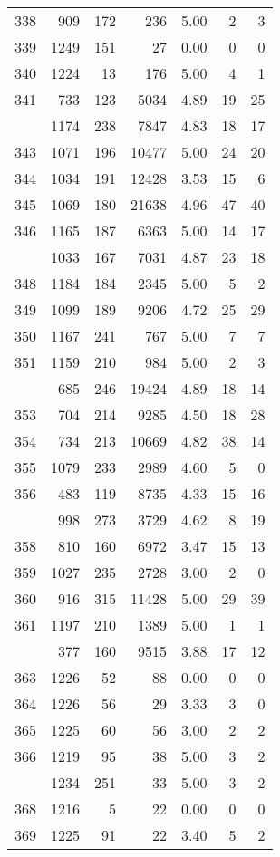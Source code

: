 \documentclass[
]{article}
\begin{document}
\begin{table}
\begin{tabular}[t]{lrrrrrr}
338 & 909 & 172 & 236 & 5.00 & 2 & 3\\
339 & 1249 & 151 & 27 & 0.00 & 0 & 0\\
340 & 1224 & 13 & 176 & 5.00 & 4 & 1\\
341 & 733 & 123 & 5034 & 4.89 & 19 & 25\\
\addlinespace
342 & 1174 & 238 & 7847 & 4.83 & 18 & 17\\
343 & 1071 & 196 & 10477 & 5.00 & 24 & 20\\
344 & 1034 & 191 & 12428 & 3.53 & 15 & 6\\
345 & 1069 & 180 & 21638 & 4.96 & 47 & 40\\
346 & 1165 & 187 & 6363 & 5.00 & 14 & 17\\
\addlinespace
347 & 1033 & 167 & 7031 & 4.87 & 23 & 18\\
348 & 1184 & 184 & 2345 & 5.00 & 5 & 2\\
349 & 1099 & 189 & 9206 & 4.72 & 25 & 29\\
350 & 1167 & 241 & 767 & 5.00 & 7 & 7\\
351 & 1159 & 210 & 984 & 5.00 & 2 & 3\\
\addlinespace
352 & 685 & 246 & 19424 & 4.89 & 18 & 14\\
353 & 704 & 214 & 9285 & 4.50 & 18 & 28\\
354 & 734 & 213 & 10669 & 4.82 & 38 & 14\\
355 & 1079 & 233 & 2989 & 4.60 & 5 & 0\\
356 & 483 & 119 & 8735 & 4.33 & 15 & 16\\
\addlinespace
357 & 998 & 273 & 3729 & 4.62 & 8 & 19\\
358 & 810 & 160 & 6972 & 3.47 & 15 & 13\\
359 & 1027 & 235 & 2728 & 3.00 & 2 & 0\\
360 & 916 & 315 & 11428 & 5.00 & 29 & 39\\
361 & 1197 & 210 & 1389 & 5.00 & 1 & 1\\
\addlinespace
362 & 377 & 160 & 9515 & 3.88 & 17 & 12\\
363 & 1226 & 52 & 88 & 0.00 & 0 & 0\\
364 & 1226 & 56 & 29 & 3.33 & 3 & 0\\
365 & 1225 & 60 & 56 & 3.00 & 2 & 2\\
366 & 1219 & 95 & 38 & 5.00 & 3 & 2\\
\addlinespace
367 & 1234 & 251 & 33 & 5.00 & 3 & 2\\
368 & 1216 & 5 & 22 & 0.00 & 0 & 0\\
369 & 1225 & 91 & 22 & 3.40 & 5 & 2\\

\end{tabular}
\end{table}
\end{document}
